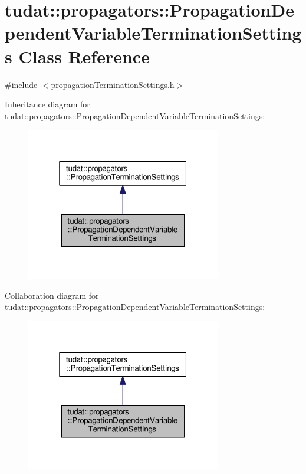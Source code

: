 \hypertarget{classtudat_1_1propagators_1_1PropagationDependentVariableTerminationSettings}{}\section{tudat\+:\+:propagators\+:\+:Propagation\+Dependent\+Variable\+Termination\+Settings Class Reference}
\label{classtudat_1_1propagators_1_1PropagationDependentVariableTerminationSettings}


{\ttfamily \#include $<$propagation\+Termination\+Settings.\+h$>$}



Inheritance diagram for tudat\+:\+:propagators\+:\+:Propagation\+Dependent\+Variable\+Termination\+Settings\+:
\nopagebreak
\begin{figure}[H]
\begin{center}
\leavevmode
\includegraphics[width=241pt]{classtudat_1_1propagators_1_1PropagationDependentVariableTerminationSettings__inherit__graph}
\end{center}
\end{figure}


Collaboration diagram for tudat\+:\+:propagators\+:\+:Propagation\+Dependent\+Variable\+Termination\+Settings\+:
\nopagebreak
\begin{figure}[H]
\begin{center}
\leavevmode
\includegraphics[width=241pt]{classtudat_1_1propagators_1_1PropagationDependentVariableTerminationSettings__coll__graph}
\end{center}
\end{figure}
